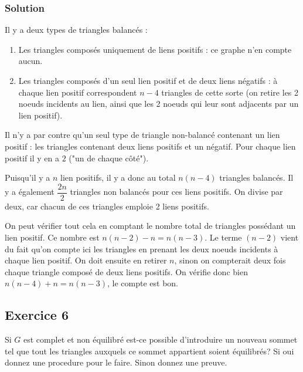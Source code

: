     \subsubsection*{Solution}
    Il y a deux types de triangles balancés :
    \begin{enumerate}
        \item Les triangles composés uniquement de liens positifs : ce graphe n'en compte aucun.
        \item Les triangles composés d'un seul lien positif et de deux liens négatifs : à chaque lien positif correspondent $n-4$ triangles de cette sorte (on retire les 2 noeuds incidents au lien, ainsi que les 2 noeuds qui leur sont adjacents par un lien positif).
    \end{enumerate}
    
    Il n'y a par contre qu'un seul type de triangle non-balancé contenant un lien positif : les triangles contenant deux liens positifs et un négatif.
    Pour chaque lien positif il y en a $2$ ("un de chaque côté").
    
    Puisqu'il y a $n$ lien positifs, il y a donc au total $n(n-4)$ triangles balancés. Il y a également $\dfrac{2n}{2}$ triangles non balancés pour ces liens positifs. On divise par deux, car chacun de ces triangles emploie 2 liens positifs.
    
    On peut vérifier tout cela en comptant le nombre total de triangles possédant un lien positif.
    Ce nombre est $n(n-2) - n = n(n-3)$. Le terme $(n-2)$ vient du fait qu'on compte ici les triangles en prenant les deux noeuds incidents à chaque lien positif. On doit ensuite en retirer $n$, sinon on compterait deux fois chaque triangle composé de deux liens positifs.
    On vérifie donc bien $n(n-4) + n = n(n-3)$, le compte est bon.

\subsection*{Exercice 6}
Si $G$ est complet et non \'{e}quilibr\'{e} est-ce possible d'introduire un nouveau sommet tel que tout les triangles auxquels ce sommet appartient soient \'{e}quilibr\'{e}s?
Si oui donnez une procedure pour le faire. Sinon donnez une preuve.

